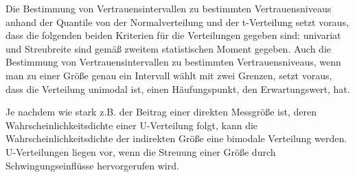 Die Bestimmung von Vertrauensintervallen zu bestimmten Vertrauensniveaus anhand der Quantile
von der Normalverteilung und der t-Verteilung setzt voraus, dass die folgenden beiden Kriterien für die Verteilungen gegeben sind: univariat und Streubreite sind gemäß zweitem statistischen Moment gegeben. Auch die Bestimmung von Vertrauensintervallen zu bestimmten Vertrauensniveaus, wenn man
zu einer Größe genau ein Intervall wählt mit zwei Grenzen, setzt voraus, dass die Verteilung unimodal ist, einen Häufungspunkt, den Erwartungswert, hat.

Je nachdem wie stark z.B. der Beitrag einer direkten Messgröße ist, deren Wahrscheinlichkeitsdichte
einer U-Verteilung folgt, kann die Wahrscheinlichkeitsdichte der indirekten Größe
eine bimodale Ver\-teilung werden. U-Verteilungen liegen vor, wenn die Streuung einer Größe
durch Schwingungseinflüsse hervorgerufen wird.

